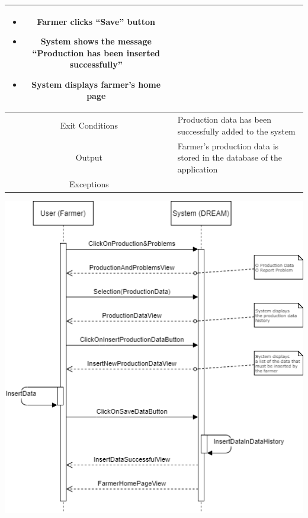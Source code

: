 \documentclass{article}
\begin{document}
\begin{center}
\begin{longtable}{|c| p{10cm}|}
\begin{itemize}
                                \item Farmer clicks “Save” button
                                \item System shows the message “Production has been inserted successfully” 
                                \item System displays farmer’s home page
                            \end{itemize} \\
        \hline
            Exit Conditions & Production data has been successfully added to the system\\
        \hline
            Output & Farmer’s production data is stored in the database of the application\\
        \hline
            Exceptions &\\
        \hline
    \end{longtable}
    
    \newpage
    
    \includegraphics[width=1\textwidth]{images/sequenceDiagrams/4. FarmerInsertProductionData.png}
    \par 
    \caption{\label{fig:frog}Farmer insert “Production Data”}

    \newpage
    

\end{center}
\end{document}
